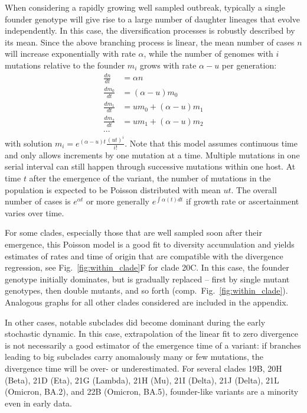\documentclass[aps,rmp, twocolumn]{revtex4}
\begin{document}
When considering a rapidly growing well sampled outbreak, typically a single founder genotype will give rise to a large number of daughter lineages that evolve independently.
In this case, the diversification processes is robustly described by its mean.
Since the above branching process is linear, the mean number of cases $n$ will increase exponentially with rate $\alpha$, while the number of genomes with $i$ mutations relative to the founder $m_i$ grows with rate $\alpha - u$ per generation:
\begin{equation}
    \begin{split}
        \frac{dn}{dt} &= \alpha n \\
        \frac{dm_0}{dt} &= (\alpha - u) m_0 \\
        \frac{dm_1}{dt} &= u m_0 + (\alpha - u) m_1 \\
        \frac{dm_2}{dt} &= u m_1 + (\alpha - u) m_2 \\
        \cdots
    \end{split}
\end{equation}
with solution $m_i = e^{(\alpha - u)t} \frac{(ut)^i}{i!}$.
Note that this model assumes continuous time and only allows increments by one mutation at a time.
Multiple mutations in one serial interval can still happen through successive mutations within one host.
At time $t$ after the emergence of the variant, the number of mutations in the population is expected to be Poisson distributed with mean $ut$.
The overall number of cases is $e^{\alpha t}$ or more generally $e^{\int \alpha(t) dt}$ if growth rate or ascertainment varies over time.

For some clades, especially those that are well sampled soon after their emergence, this Poisson model is a good fit to diversity accumulation and yields estimates of rates and time of origin that are compatible with the divergence regression, see Fig.~\ref{fig:within_clade}F for clade 20C.
In this case, the founder genotype initially dominates, but is gradually replaced -- first by single mutant genotypes, then double mutants, and so forth (comp.~Fig.~\ref{fig:within_clade}).
Analogous graphs for all other clades considered are included in the appendix.

In other cases, notable subclades did become dominant during the early stochastic dynamic.
In this case, extrapolation of the linear fit to zero divergence is not necessarily a good estimator of the emergence time of a variant: if branches leading to big subclades carry anomalously many or few mutations, the divergence time will be over- or underestimated.
For several clades 19B, 20H (Beta), 21D (Eta), 21G (Lambda), 21H (Mu), 21I (Delta), 21J (Delta), 21L (Omicron, BA.2), and 22B (Omicron, BA.5), founder-like variants are a minority even in early data.
\end{document}
